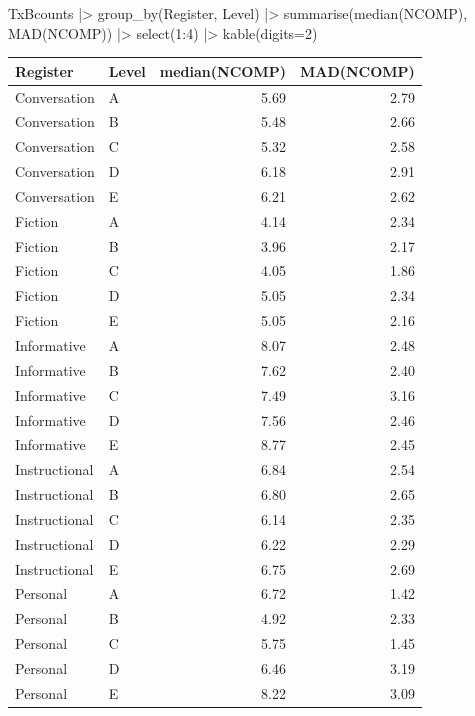 \documentclass[
  letterpaper,
  DIV=11,
  numbers=noendperiod]{scrreprt}
\newenvironment{Shaded}{\begin{snugshade}}{\end{snugshade}}
\newcommand{\AttributeTok}[1]{\textcolor[rgb]{0.40,0.45,0.13}{#1}}
\newcommand{\DecValTok}[1]{\textcolor[rgb]{0.68,0.00,0.00}{#1}}
\newcommand{\FunctionTok}[1]{\textcolor[rgb]{0.28,0.35,0.67}{#1}}
\newcommand{\NormalTok}[1]{\textcolor[rgb]{0.00,0.23,0.31}{#1}}
\newcommand{\SpecialCharTok}[1]{\textcolor[rgb]{0.37,0.37,0.37}{#1}}
\begin{document}
\begin{Shaded}
\begin{Highlighting}[]
\NormalTok{TxBcounts }\SpecialCharTok{|\textgreater{}} 
  \FunctionTok{group\_by}\NormalTok{(Register, Level) }\SpecialCharTok{|\textgreater{}} 
  \FunctionTok{summarise}\NormalTok{(}\FunctionTok{median}\NormalTok{(NCOMP), }\FunctionTok{MAD}\NormalTok{(NCOMP)) }\SpecialCharTok{|\textgreater{}} 
  \FunctionTok{select}\NormalTok{(}\DecValTok{1}\SpecialCharTok{:}\DecValTok{4}\NormalTok{) }\SpecialCharTok{|\textgreater{}} 
  \FunctionTok{kable}\NormalTok{(}\AttributeTok{digits=}\DecValTok{2}\NormalTok{)}
\end{Highlighting}
\end{Shaded}

\begin{longtable}[]{@{}llrr@{}}
\toprule\noalign{}
Register & Level & median(NCOMP) & MAD(NCOMP) \\
\midrule\noalign{}
\endhead
\bottomrule\noalign{}
\endlastfoot
Conversation & A & 5.69 & 2.79 \\
Conversation & B & 5.48 & 2.66 \\
Conversation & C & 5.32 & 2.58 \\
Conversation & D & 6.18 & 2.91 \\
Conversation & E & 6.21 & 2.62 \\
Fiction & A & 4.14 & 2.34 \\
Fiction & B & 3.96 & 2.17 \\
Fiction & C & 4.05 & 1.86 \\
Fiction & D & 5.05 & 2.34 \\
Fiction & E & 5.05 & 2.16 \\
Informative & A & 8.07 & 2.48 \\
Informative & B & 7.62 & 2.40 \\
Informative & C & 7.49 & 3.16 \\
Informative & D & 7.56 & 2.46 \\
Informative & E & 8.77 & 2.45 \\
Instructional & A & 6.84 & 2.54 \\
Instructional & B & 6.80 & 2.65 \\
Instructional & C & 6.14 & 2.35 \\
Instructional & D & 6.22 & 2.29 \\
Instructional & E & 6.75 & 2.69 \\
Personal & A & 6.72 & 1.42 \\
Personal & B & 4.92 & 2.33 \\
Personal & C & 5.75 & 1.45 \\
Personal & D & 6.46 & 3.19 \\
Personal & E & 8.22 & 3.09 \\
\end{longtable}
\end{document}
